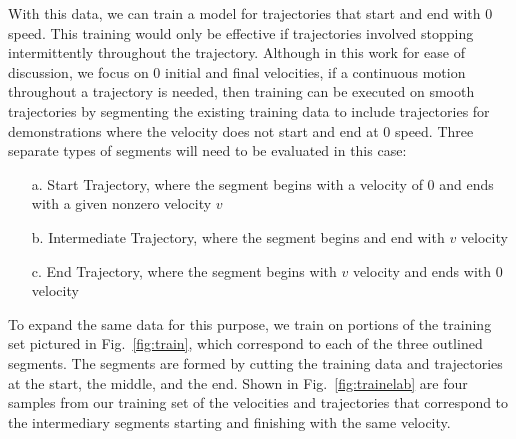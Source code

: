 \documentclass[letterpaper, 10 pt, conference]{ieeeconf}  %
\newcommand\NB[1]{$\spadesuit$\footnote{NB: #1}}
\begin{document}
With this data, we can train a model for trajectories that start and end with $0$ speed. This training would only be effective if trajectories involved stopping intermittently throughout the trajectory. Although in this work for ease of discussion, we focus on $0$ initial and final velocities, if a continuous motion throughout a trajectory is needed, then training can be executed on smooth trajectories by segmenting the existing training data to include trajectories for demonstrations where the velocity does not start and end at $0$ speed. Three separate types of segments will need to be evaluated in this case:
\begin{itemize}
    \item[a.] Start Trajectory, where the segment begins with a velocity of $0$ and ends with a given nonzero velocity $v$
    \item[b.] Intermediate Trajectory, where the segment begins and end with $v$ velocity
    \item[c.] End Trajectory, where the segment begins with $v$ velocity and ends with $0$ velocity
\end{itemize}
To expand the same data for this purpose, we train on portions of the training set pictured in Fig.~\ref{fig:train}, which correspond to each of the three outlined segments. The segments are formed by cutting the training data and trajectories at the start, the middle, and the end. Shown in Fig.~\ref{fig:trainelab} are four samples from our training set of the velocities and trajectories that correspond to the intermediary segments starting and finishing with the same velocity. %
\end{document}
